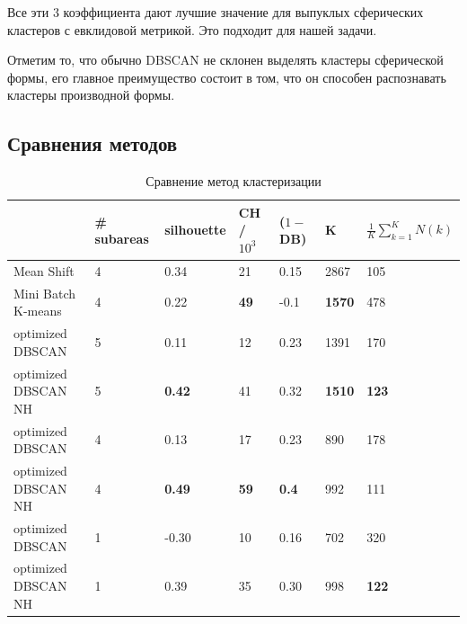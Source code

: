 \documentclass[12pt,fleqn]{article}
\begin{document}
\begin{itemize}
  Все эти 3 коэффициента дают лучшие значение для выпуклых сферических кластеров с евклидовой метрикой. Это подходит для нашей задачи.

   Отметим то, что обычно DBSCAN не склонен выделять кластеры сферической формы, его главное преимущество состоит в том, что он способен распознавать кластеры производной формы.
\end{itemize}

\subsection{Сравнения методов}


 \begin{table}[h]
 \begin{center}
\begin{tabular}{|l|l|l|l|l|l|l|}
\hline
                    & \# subareas & silhouette    & CH / $10^3$    & ($1 -$ DB)    & K             & $\frac{1}{K}\sum_{k=1}^{K}N(k)$           \\ \hline
Mean Shift          & 4           & 0.34          & 21          & 0.15         & 2867          & 105          \\ \hline
Mini Batch K-means  & 4           & 0.22          & \textbf{49} & -0.1         & \textbf{1570} & 478          \\ \hline
optimized DBSCAN    & 5           & 0.11          & 12          & 0.23         & 1391          & 170          \\
optimized DBSCAN NH & 5           & \textbf{0.42} & 41          & 0.32         & \textbf{1510} & \textbf{123} \\ \hline
optimized DBSCAN    & 4           & 0.13          & 17          & 0.23         & 890           & 178          \\
optimized DBSCAN NH & 4           & \textbf{0.49} & \textbf{59} & \textbf{0.4} & 992           & 111          \\ \hline
optimized DBSCAN    & 1           & -0.30         & 10          & 0.16         & 702           & 320          \\
optimized DBSCAN NH & 1           & 0.39          & 35          & 0.30          & 998           & \textbf{122} \\ \hline


\end{tabular}
\caption{Сравнение метод кластеризации}\label{all_methods}
\end{center}
\end{table}
\end{document}
